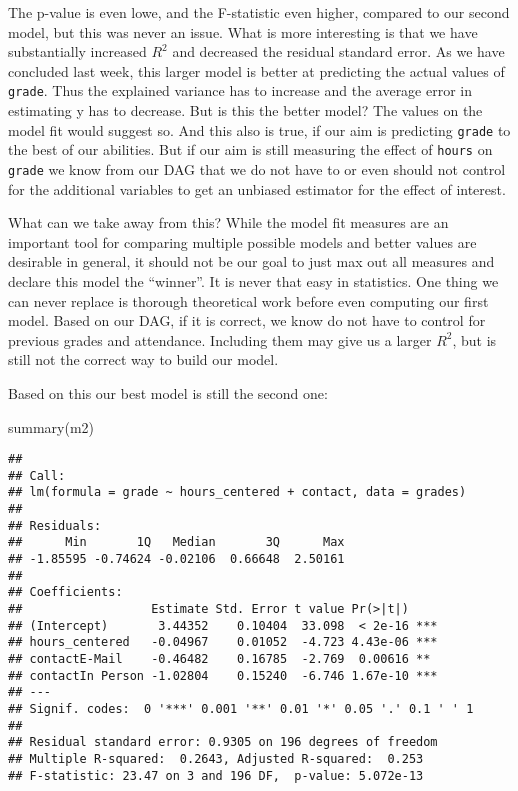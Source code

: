 \documentclass[
]{book}
\newenvironment{Shaded}{\begin{snugshade}}{\end{snugshade}}
\newcommand{\FunctionTok}[1]{\textcolor[rgb]{0.00,0.00,0.00}{#1}}
\newcommand{\NormalTok}[1]{#1}
\begin{document}
The p-value is even lowe, and the F-statistic even higher, compared to our
second model, but this was never an issue. What is more interesting is that we
have substantially increased \(R^2\) and decreased the residual standard error.
As we have concluded last week, this larger model is better at predicting the
actual values of \texttt{grade}. Thus the explained variance has to increase and the
average error in estimating y has to decrease. But is this the better model? The
values on the model fit would suggest so. And this also is true, if our aim is
predicting \texttt{grade} to the best of our abilities. But if our aim is still
measuring the effect of \texttt{hours} on \texttt{grade} we know from our DAG that we do not
have to or even should not control for the additional variables to get an
unbiased estimator for the effect of interest.

What can we take away from this? While the model fit measures are an important
tool for comparing multiple possible models and better values are desirable in
general, it should not be our goal to just max out all measures and declare this
model the ``winner''. It is never that easy in statistics.
One thing we can never replace is thorough theoretical work before even
computing our first model. Based on our DAG, if it is correct, we know do not
have to control for previous grades and attendance. Including them may give us a
larger \(R^2\), but is still not the correct way to build our model.

Based on this our best model is still the second one:

\begin{Shaded}
\begin{Highlighting}[]
\FunctionTok{summary}\NormalTok{(m2)}
\end{Highlighting}
\end{Shaded}

\begin{verbatim}
## 
## Call:
## lm(formula = grade ~ hours_centered + contact, data = grades)
## 
## Residuals:
##      Min       1Q   Median       3Q      Max 
## -1.85595 -0.74624 -0.02106  0.66648  2.50161 
## 
## Coefficients:
##                  Estimate Std. Error t value Pr(>|t|)    
## (Intercept)       3.44352    0.10404  33.098  < 2e-16 ***
## hours_centered   -0.04967    0.01052  -4.723 4.43e-06 ***
## contactE-Mail    -0.46482    0.16785  -2.769  0.00616 ** 
## contactIn Person -1.02804    0.15240  -6.746 1.67e-10 ***
## ---
## Signif. codes:  0 '***' 0.001 '**' 0.01 '*' 0.05 '.' 0.1 ' ' 1
## 
## Residual standard error: 0.9305 on 196 degrees of freedom
## Multiple R-squared:  0.2643, Adjusted R-squared:  0.253 
## F-statistic: 23.47 on 3 and 196 DF,  p-value: 5.072e-13
\end{verbatim}
\end{document}
